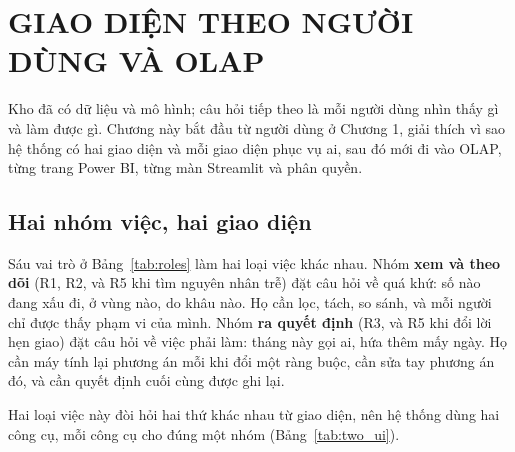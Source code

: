 \section{GIAO DIỆN THEO NGƯỜI DÙNG VÀ OLAP}
\suppressfloats[t]

Kho đã có dữ liệu và mô hình; câu hỏi tiếp theo là mỗi người dùng nhìn thấy gì và làm được gì. Chương này bắt đầu từ người dùng ở Chương 1, giải thích vì sao hệ thống có hai giao diện và mỗi giao diện phục vụ ai, sau đó mới đi vào OLAP, từng trang Power BI, từng màn Streamlit và phân quyền.

\subsection{Hai nhóm việc, hai giao diện}
Sáu vai trò ở Bảng~\ref{tab:roles} làm hai loại việc khác nhau. Nhóm \textbf{xem và theo dõi} (R1, R2, và R5 khi tìm nguyên nhân trễ) đặt câu hỏi về quá khứ: số nào đang xấu đi, ở vùng nào, do khâu nào. Họ cần lọc, tách, so sánh, và mỗi người chỉ được thấy phạm vi của mình. Nhóm \textbf{ra quyết định} (R3, và R5 khi đổi lời hẹn giao) đặt câu hỏi về việc phải làm: tháng này gọi ai, hứa thêm mấy ngày. Họ cần máy tính lại phương án mỗi khi đổi một ràng buộc, cần sửa tay phương án đó, và cần quyết định cuối cùng được ghi lại.

Hai loại việc này đòi hỏi hai thứ khác nhau từ giao diện, nên hệ thống dùng hai công cụ, mỗi công cụ cho đúng một nhóm (Bảng~\ref{tab:two_ui}).

